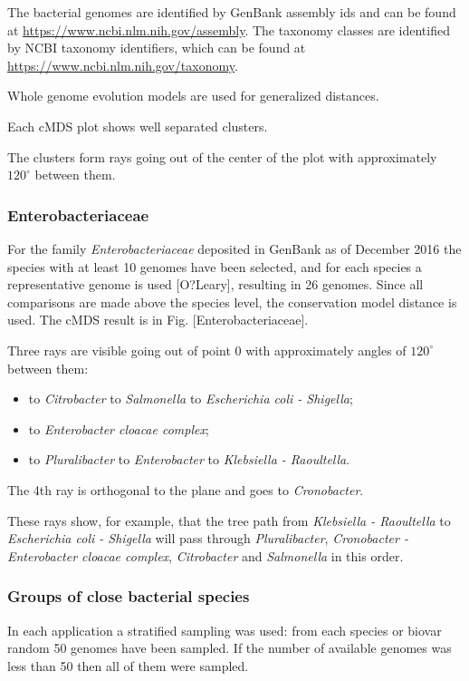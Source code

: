 \documentclass[10pt,a4paper]{article}
\begin{document}
The bacterial genomes are identified by GenBank assembly ids and can be found at \url{https://www.ncbi.nlm.nih.gov/assembly}.
The taxonomy classes are identified by NCBI taxonomy identifiers, which can be found at \url{https://www.ncbi.nlm.nih.gov/taxonomy}.

Whole genome evolution models are used for generalized distances.

Each cMDS plot shows well separated clusters.

The clusters form rays going out of the center of the plot with approximately $120^\circ$ between them.


\subsubsection{Enterobacteriaceae}

For the family {\it Enterobacteriaceae} deposited in GenBank as of December 2016
the species with at least 10 genomes have been selected,
and for each species a representative genome is used [O?Leary], resulting in 26 genomes.
Since all comparisons are made above the species level, the conservation model distance is used.
The cMDS result is in Fig. [Enterobacteriaceae].

Three rays are visible going out of point 0 with approximately angles of $120^\circ$ between them:
\begin{itemize}
\item to {\it Citrobacter} to {\it Salmonella} to {\it  Escherichia coli - Shigella};
\item to {\it Enterobacter cloacae complex};
\item to {\it Pluralibacter} to {\it Enterobacter} to {\it Klebsiella - Raoultella}.
\end{itemize}

The 4th ray is orthogonal to the plane and goes to {\it Cronobacter}.

These rays show, for example, that the tree path from {\it Klebsiella - Raoultella} to {\it Escherichia coli - Shigella} will pass through {\it Pluralibacter}, {\it Cronobacter - Enterobacter cloacae complex},
{\it Citrobacter} and {\it Salmonella} in this order.


\subsubsection{Groups of close bacterial species}

In each application a stratified sampling was used: from each species or biovar random 50 genomes have been sampled.
If the number of available genomes was less than 50 then all of them were sampled.
\end{document}
